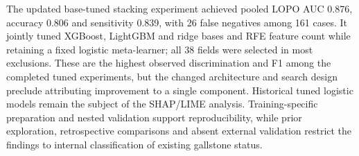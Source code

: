 The updated base-tuned stacking experiment achieved pooled LOPO AUC 0.876, accuracy 0.806 and sensitivity 0.839, with 26 false negatives among 161 cases. It jointly tuned XGBoost, LightGBM and ridge bases and RFE feature count while retaining a fixed logistic meta-learner; all 38 fields were selected in most exclusions. These are the highest observed discrimination and F1 among the completed tuned experiments, but the changed architecture and search design preclude attributing improvement to a single component. Historical tuned logistic models remain the subject of the SHAP/LIME analysis. Training-specific preparation and nested validation support reproducibility, while prior exploration, retrospective comparisons and absent external validation restrict the findings to internal classification of existing gallstone status.
